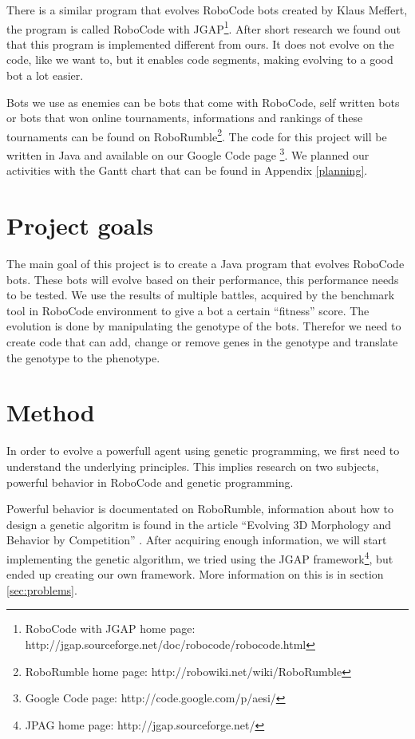 \documentclass[a4paper,10pt]{article}
\begin{document}
There is a similar program that evolves RoboCode bots created by Klaus Meffert, the program is called RoboCode with JGAP\footnote{RoboCode with JGAP home page: http://jgap.sourceforge.net/doc/robocode/robocode.html}. After short research we found out that this program is implemented different from ours. It does not evolve on the code, like we want to, but it enables code segments, making evolving to a good bot a lot easier.

Bots we use as enemies can be bots that come with RoboCode, self written bots or bots that won online tournaments, informations and rankings of these tournaments can be found on RoboRumble\footnote{RoboRumble home page: http://robowiki.net/wiki/RoboRumble}.
The code for this project will be written in Java and available on our Google Code page \footnote{Google Code page: http://code.google.com/p/aesi/}.
We planned our activities with the Gantt chart that can be found in Appendix \ref{planning}.

\section{Project goals}
The main goal of this project is to create a Java program that evolves RoboCode bots.
These bots will evolve based on their performance, this performance needs to be tested. We use the results of multiple battles, acquired by the benchmark tool in RoboCode environment to give a bot a certain ``fitness'' score.
The evolution is done by manipulating the genotype of the bots. Therefor we need to create code that can add, change or remove genes in the genotype and translate the genotype to the phenotype.

\section{Method}
In order to evolve a powerfull agent using genetic programming, we first need to understand the underlying principles. This implies research on two subjects, powerful behavior in RoboCode and genetic programming.

Powerful behavior is documentated on RoboRumble, information about how to design a genetic algoritm is found in the article ``Evolving 3D Morphology and Behavior by Competition'' \cite{karlsims}.
After acquiring enough information, we will start implementing the genetic algorithm, we tried using the JGAP framework\footnote{JPAG home page: http://jgap.sourceforge.net/}, but ended up creating our own framework. More information on this is in section \ref{sec:problems}.
\end{document}
